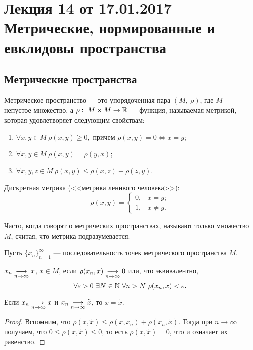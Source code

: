 \section{Лекция 14 от 17.01.2017 \\ Метрические, нормированные и евклидовы пространства}

\subsection{Метрические пространства}

\begin{Def}
Метрическое пространство --- это упорядоченная пара $(M,\ \rho)$, где $M$ --- непустое множество, а $\rho:\ M\times M \to \mathbb{R}$ --- функция, называемая метрикой, которая удовлетворяет следующим свойствам:
\begin{enumerate}
\item $\forall x, y \in M\ \rho(x, y) \geq 0,$ причем $\rho(x, y) = 0 \Leftrightarrow x = y$;
\item $\forall x, y \in M\ \rho(x, y) = \rho(y, x)$;
\item $\forall x, y, z \in M\ \rho(x, y) \leq \rho(x, z) + \rho(z, y)$.
\end{enumerate}
\end{Def}

\begin{Examples}
Дискретная метрика (<<метрика ленивого человека>>):
$$
\rho(x, y) = \begin{cases}
0, & x = y;\\
1, & x \neq y.
\end{cases}
$$
\end{Examples}

Часто, когда говорят о метрических пространствах, называют только множество $M$, считая, что метрика подразумевается.

Пусть $\{x_n\}_{n=1}^{\infty}$ --- последовательность точек метрического пространства $M$.
\begin{Def}
$x_n \underset{n\to \infty}{\longrightarrow} x $, $x\in M$, если $\rho(x_n, x) \underset{n\to \infty}{\longrightarrow} 0$ или, что эквивалентно,
$$
\forall \varepsilon > 0\ \exists N \in \mathbb{N}\ \forall n > N\ \rho(x_n, x) < \varepsilon.
$$
\end{Def}

\begin{Statement}
Если $x_n \underset{n\to \infty}{\longrightarrow} x$ и $x_n \underset{n\to \infty}{\longrightarrow} \widetilde{x}$, то $x = \widetilde{x}$.
\end{Statement}
\begin{proof}
Вспомним, что $\rho(x, \widetilde{x}) \leq \rho(x, x_n) + \rho(x_n, \widetilde{x})$. Тогда при $n \to \infty$ получаем, что $0 \leq \rho(x, \widetilde{x}) \leq 0$, то есть $\rho(x, \widetilde{x}) = 0$, что и означает их равенство. 
\end{proof}

